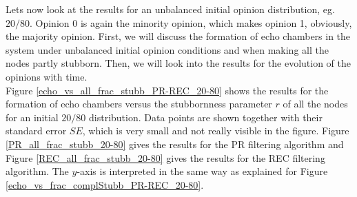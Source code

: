 \documentclass[11 pt , letterpaper , twoside , openright]{book}
\begin{document}
\newline
Lets now look at the results for an unbalanced initial opinion distribution, eg. $20/80$. Opinion 0 is again the minority opinion, which makes opinion 1, obviously, the majority opinion. First, we will discuss the formation of echo chambers in the system under unbalanced initial opinion conditions and when making all the nodes partly stubborn. Then, we will look into the results for the evolution of the opinions with time.\\
\newline
Figure \ref{echo_vs_all_frac_stubb_PR-REC_20-80} shows the results for the formation of echo chambers versus the stubbornness parameter $r$ of all the nodes for an initial $20/80$ distribution. Data points are shown together with their standard error $SE$, which is very small and not really visible in the figure. Figure \ref{PR_all_frac_stubb_20-80} gives the results for the PR filtering algorithm and Figure \ref{REC_all_frac_stubb_20-80} gives the results for the REC filtering algorithm. The $y$-axis is interpreted in the same way as explained for Figure \ref{echo_vs_frac_complStubb_PR-REC_20-80}.\\
\end{document}
